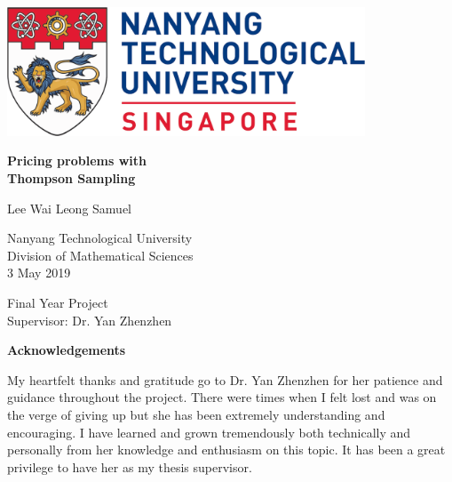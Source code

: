 \documentclass[a4paper]{article}
\begin{document}
\begin{titlepage}
	\begin{center}
		
		\includegraphics[width=0.8\textwidth]{NTU.png}
		\vspace{2cm}
		
		\huge
		
		\textbf{Pricing problems with \\Thompson Sampling}
		
		\vspace{1cm}
		\Large
		Lee Wai Leong Samuel
		
		\vspace{2cm}
		\Large
		Nanyang Technological University\\
		Division of Mathematical Sciences\\
		3 May 2019
		
		\vfill
		
		Final Year Project\\
		Supervisor: Dr. Yan Zhenzhen
		
		\vspace{0.8cm}
		
	\end{center}
\end{titlepage}
\begin{center}
	\large
	\textbf{Acknowledgements}
	\vspace{1cm}
\end{center}	
\large
My heartfelt thanks and gratitude go to Dr. Yan Zhenzhen for her patience and guidance throughout the project. There were times when I felt lost and was on the verge of giving up but she has been extremely understanding and encouraging. I have learned and grown tremendously both technically and personally from her knowledge and enthusiasm on this topic. It has been a great privilege to have her as my thesis supervisor.
\end{document}
